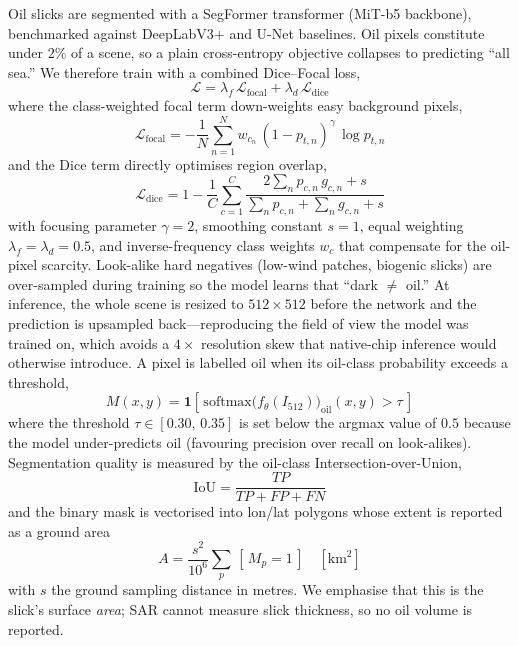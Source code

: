 \documentclass{ieeeaccess}
\begin{document}
Oil slicks are segmented with a SegFormer transformer (MiT-b5 backbone), benchmarked against DeepLabV3+ and U-Net baselines. Oil pixels constitute under $2\%$ of a scene, so a plain cross-entropy objective collapses to predicting ``all sea.'' We therefore train with a combined Dice--Focal loss,
\begin{equation}
\mathcal{L} = \lambda_f\,\mathcal{L}_{\text{focal}} + \lambda_d\,\mathcal{L}_{\text{dice}}
\label{eq:loss}
\end{equation}
where the class-weighted focal term down-weights easy background pixels,
\begin{equation}
\mathcal{L}_{\text{focal}} = -\frac{1}{N}\sum_{n=1}^{N} w_{c_n}\,(1 - p_{t,n})^{\gamma}\,\log p_{t,n}
\label{eq:focal}
\end{equation}
and the Dice term directly optimises region overlap,
\begin{equation}
\mathcal{L}_{\text{dice}} = 1 - \frac{1}{C}\sum_{c=1}^{C}
\frac{2\sum_n p_{c,n}\,g_{c,n} + s}{\sum_n p_{c,n} + \sum_n g_{c,n} + s}
\label{eq:dice}
\end{equation}
with focusing parameter $\gamma=2$, smoothing constant $s=1$, equal weighting $\lambda_f=\lambda_d=0.5$, and inverse-frequency class weights $w_c$ that compensate for the oil-pixel scarcity. Look-alike hard negatives (low-wind patches, biogenic slicks) are over-sampled during training so the model learns that ``dark $\neq$ oil.'' At inference, the whole scene is resized to $512\times512$ before the network and the prediction is upsampled back---reproducing the field of view the model was trained on, which avoids a $4\times$ resolution skew that native-chip inference would otherwise introduce. A pixel is labelled oil when its oil-class probability exceeds a threshold,
\begin{equation}
M(x,y) = \mathbf{1}\!\left[\,\mathrm{softmax}\big(f_\theta(I_{512})\big)_{\text{oil}}(x,y) > \tau\,\right]
\label{eq:mask}
\end{equation}
where the threshold $\tau\in[0.30,\,0.35]$ is set below the argmax value of $0.5$ because the model under-predicts oil (favouring precision over recall on look-alikes). Segmentation quality is measured by the oil-class Intersection-over-Union,
\begin{equation}
\text{IoU} = \frac{TP}{TP + FP + FN}
\label{eq:iou}
\end{equation}
and the binary mask is vectorised into lon/lat polygons whose extent is reported as a ground area
\begin{equation}
A = \frac{s^2}{10^6}\sum_{p}\,[\,M_p = 1\,] \quad [\text{km}^2]
\label{eq:area}
\end{equation}
with $s$ the ground sampling distance in metres. We emphasise that this is the slick's surface \emph{area}; SAR cannot measure slick thickness, so no oil volume is reported.
\end{document}
